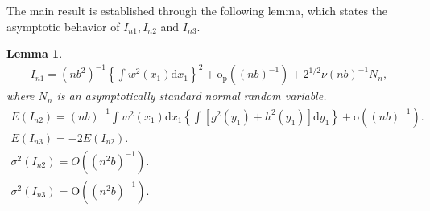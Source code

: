 \documentclass{article}
\newtheorem{lemma}{Lemma}[section]
\begin{document}
The main result is established through the following lemma, which states the asymptotic behavior of $I_{n1}, I_{n2}$ and $I_{n3}$.
\begin{lemma}
    \begin{align}
        I_{n 1}=\left(n b^2\right)^{-1}\left\{\int w^2\left(x_1\right) \mathrm{d} x_1\right\}^2+\mathrm{o}_{\mathrm{p}}\left((n b)^{-1}\right)+2^{1 / 2} \nu(n b)^{-1} N_n,
    \end{align}
    where $N_n$ is an asymptotically standard normal random variable.
    \begin{align}
        E\left(I_{n 2}\right)=(n b)^{-1} \int w^2\left(x_1\right) \mathrm{d} x_1\left\{\int\left[g^2\left(y_1\right)+h^2\left(y_1\right)\right] \mathrm{d} y_1\right\}+\mathrm{o}\left((n b)^{-1}\right). \\
        E\left(I_{n 3}\right)=-2 E\left(I_{n 2}\right). \\
        \sigma^2\left(I_{n 2}\right)=O\left(\left(n^2 b\right)^{-1}\right). \\
        \sigma^2\left(I_{n 3}\right)=\mathrm{O}\left(\left(n^2 b\right)^{-1}\right).
    \end{align}
\end{lemma}
\end{document}
